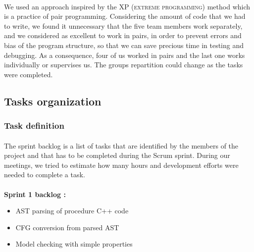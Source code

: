\documentclass{report}
\begin{document}
\paragraph{}
\hspace{4mm}We used an approach inspired by the XP (\textsc{extreme programming})
 method which is a practice of pair programming. Considering the amount of 
code that we had to write,
 we found it unnecessary that the five team members work separately,
 and we considered as excellent to work in pairs, in order to prevent 
errors and bias of the program structure, so that we can save precious time
 in testing and debugging. As a consequence, four of us worked
 in pairs and the last one works individually or supervises us. The groups repartition 
could change as the tasks were completed.

\subsection{Tasks organization}

\subsubsection{Task definition}

\paragraph{}
\hspace{4mm}The sprint backlog is a list of tasks that are identified by the members
 of the project and that has to be completed during the Scrum sprint.
During our meetings, we tried to estimate how many hours and
development efforts were needed to complete a task.

\paragraph{}
\hspace{4mm}\textbf{Sprint 1 backlog :}

\vspace{1.5mm}
\begin{itemize}
\item AST parsing of procedure C++ code\vspace{1mm}
\item CFG conversion from parsed AST\vspace{1mm}
\item Model checking with simple properties\vspace{1mm}
\end{itemize}
\end{document}
